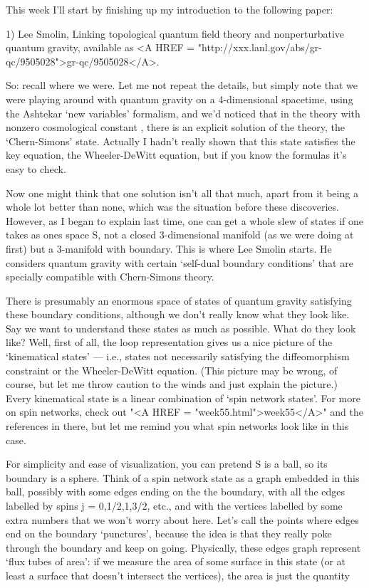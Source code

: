

This week I'll start by finishing up my introduction to
the following paper:

1) Lee Smolin, Linking topological quantum field theory and 
nonperturbative quantum gravity, available as <A HREF = "http://xxx.lanl.gov/abs/gr-qc/9505028">gr-qc/9505028</A>.

So: recall where we were.  Let me not repeat the details, but
simply note that we were playing around with quantum gravity
on a 4-dimensional spacetime, using the Ashtekar `new variables'
formalism, and we'd noticed that in the theory with nonzero cosmological 
constant \Lambda , there is an explicit solution of the theory, 
the `Chern-Simons' state.  Actually I hadn't really shown that this
state satisfies the key equation, the Wheeler-DeWitt equation, but if you
know the formulas it's easy to check. 

Now one might think that one solution isn't all that much, apart from
it being a whole lot better than none, which was the situation before
these discoveries.  However, as I began to explain last time, one can get
a whole slew of states if one takes as ones space S, not a closed 3-dimensional 
manifold (as we were doing at first) but a 3-manifold with boundary.  
This is where Lee Smolin starts.  He considers quantum gravity with
certain `self-dual boundary conditions' that are specially compatible with 
Chern-Simons theory.   

There is presumably an enormous space of states of quantum gravity 
satisfying these boundary conditions, although we don't really know what 
they look like.  Say we want to understand these states as much as possible. 
What do they look like?  Well, first of all, the loop representation gives us a 
nice picture of the `kinematical states' --- i.e., states not 
necessarily satisfying the diffeomorphism constraint or 
the Wheeler-DeWitt equation.  (This picture may be wrong, of course, 
but let me throw caution to the winds and just explain the picture.)  
Every kinematical state is a linear combination of `spin network states'.  
For more on spin networks, check out "<A HREF = "week55.html">week55</A>" and the references in there,
but let me remind you what spin networks look like in this case.

For simplicity and ease of visualization, you can pretend S is a ball, 
so its boundary is a sphere.  Think of a spin network state as a 
graph embedded in this ball, possibly with some edges ending on the 
the boundary, with all the edges labelled by spins j = 0,1/2,1,3/2, etc., and 
with the vertices labelled by some extra numbers that we won't worry 
about here.  Let's call the points where edges end on the 
boundary `punctures', because the idea is that they really poke through 
the boundary and keep on going.    Physically, these edges 
graph represent `flux tubes of area': if we measure the area of some surface
in this state (or at least a surface that doesn't intersect the vertices), 
the area is just the quantity


